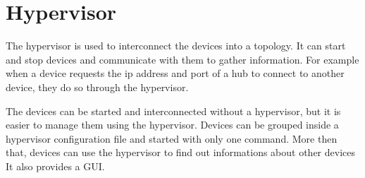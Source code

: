 \section{Hypervisor}
\label{sub-sec:hypervisor}

The hypervisor is used to interconnect the devices into a topology. It can start and stop devices and 
communicate with them to gather information. For example when a device requests the ip address and port
of a hub to connect to another device, they do so through the hypervisor.

The devices can be started and interconnected without a hypervisor, but it is easier to manage them
using the hypervisor. Devices can be grouped inside a hypervisor configuration file and started with
only one command. More then that, devices can use the hypervisor to find out informations about other devices
It also provides a GUI.

